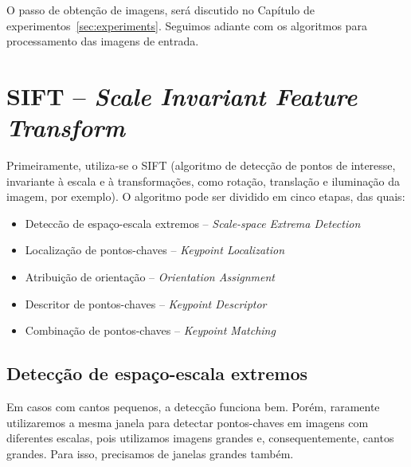 O passo de obtenção de imagens, será discutido no Capítulo de experimentos~\ref{sec:experiments}. Seguimos adiante com os algoritmos para processamento das imagens de entrada.

\section*{ SIFT -- \emph{Scale Invariant Feature Transform}}

Primeiramente, utiliza-se o SIFT (algoritmo de detecção de pontos de interesse, invariante à escala e à transformações, como rotação, translação e iluminação da imagem, por exemplo).
O algoritmo pode ser dividido em cinco etapas, das quais:

\begin{itemize}
	\item{Deteccão de espaço-escala extremos -- \emph{Scale-space Extrema Detection}}
	\item{Localização de pontos-chaves -- \emph{Keypoint Localization}}
	\item{Atribuição de orientação -- \emph{Orientation Assignment}}
	\item{Descritor de pontos-chaves -- \emph{Keypoint Descriptor}}
	\item{Combinação de pontos-chaves -- \emph{Keypoint Matching}}
\end{itemize}


\subsection*{Detecção de espaço-escala extremos}\label{DiffGaussian}


Em casos com cantos pequenos, a detecção funciona bem. Porém, raramente utilizaremos a mesma janela para detectar pontos-chaves em imagens com diferentes escalas, pois utilizamos imagens grandes e, consequentemente, cantos grandes. Para isso, precisamos de janelas grandes também. 

